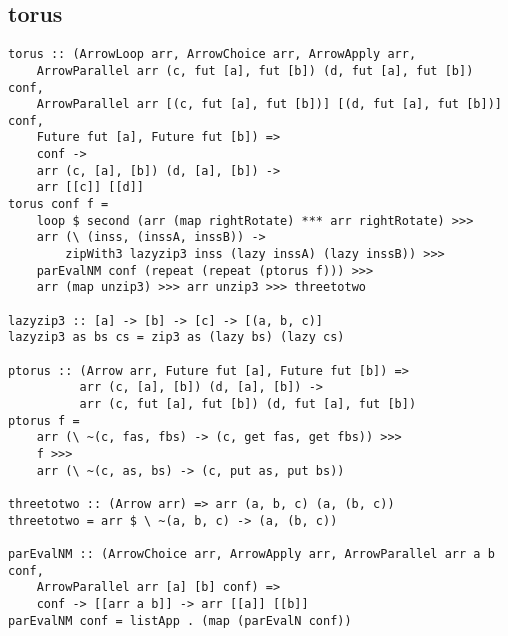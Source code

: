 \subsection{torus}

\begin{lstlisting}[frame=htrbl]
torus :: (ArrowLoop arr, ArrowChoice arr, ArrowApply arr,
    ArrowParallel arr (c, fut [a], fut [b]) (d, fut [a], fut [b]) conf,
    ArrowParallel arr [(c, fut [a], fut [b])] [(d, fut [a], fut [b])] conf,
    Future fut [a], Future fut [b]) =>
	conf ->
	arr (c, [a], [b]) (d, [a], [b])	->
	arr [[c]] [[d]]
torus conf f =
	loop $ second (arr (map rightRotate) *** arr rightRotate) >>>
	arr (\ (inss, (inssA, inssB)) ->
		zipWith3 lazyzip3 inss (lazy inssA) (lazy inssB)) >>>
	parEvalNM conf (repeat (repeat (ptorus f))) >>>
	arr (map unzip3) >>> arr unzip3 >>> threetotwo

lazyzip3 :: [a] -> [b] -> [c] -> [(a, b, c)]
lazyzip3 as bs cs = zip3 as (lazy bs) (lazy cs)

ptorus :: (Arrow arr, Future fut [a], Future fut [b]) =>
          arr (c, [a], [b]) (d, [a], [b]) ->
          arr (c, fut [a], fut [b]) (d, fut [a], fut [b])
ptorus f =
	arr (\ ~(c, fas, fbs) -> (c, get fas, get fbs)) >>>
	f >>>
	arr (\ ~(c, as, bs) -> (c, put as, put bs))

threetotwo :: (Arrow arr) => arr (a, b, c) (a, (b, c))
threetotwo = arr $ \ ~(a, b, c) -> (a, (b, c))

parEvalNM :: (ArrowChoice arr, ArrowApply arr, ArrowParallel arr a b conf,
	ArrowParallel arr [a] [b] conf) =>
	conf -> [[arr a b]] -> arr [[a]] [[b]]
parEvalNM conf = listApp . (map (parEvalN conf))
\end{lstlisting}
